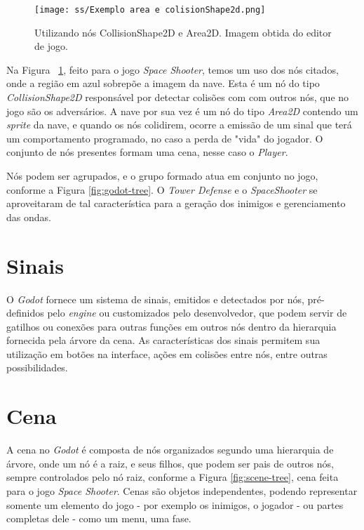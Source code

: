 \begin{figure}
  \centering
  \texttt{[image: ss/Exemplo area e colisionShape2d.png]}
  \caption{Utilizando nós CollisionShape2D e Area2D. Imagem obtida do editor de jogo.\label{fig:area-collision}}
\end{figure}

Na Figura ~\ref{fig:area-collision}, feito para o jogo \textit{Space Shooter}, temos um uso dos nós citados, onde a região em azul sobrepõe a imagem da nave. Esta é um nó do tipo \textit{CollisionShape2D} responsável por detectar colisões com com outros nós, que no jogo são os adversários. A nave por sua vez é um nó do tipo \textit{Area2D} contendo um \textit{sprite} da nave, e quando os nós colidirem, ocorre a emissão de um sinal que terá um comportamento programado, no caso a perda de "vida" do jogador. O conjunto de nós presentes formam uma cena, nesse caso o \textit{Player}.

Nós podem ser agrupados, e o grupo formado atua em conjunto no jogo, conforme a Figura \ref{fig:godot-tree}. O \textit{Tower Defense} e o \textit{SpaceShooter} se aproveitaram de tal característica para a geração dos inimigos e gerenciamento das ondas.

\section{Sinais}
\label{sec:godot-sinais}

O \textit{Godot} fornece um sistema de sinais, emitidos e detectados por nós, pré-definidos pelo \textit{engine} ou customizados pelo desenvolvedor, que podem servir de gatilhos ou conexões para outras funções em outros nós dentro da hierarquia fornecida pela árvore da cena. As características dos sinais permitem sua utilização em botões na interface, ações em colisões entre nós, entre outras possibilidades.


\section{Cena}
\label{sec:godot-cena}

A cena no \textit{Godot} é composta de nós organizados segundo uma hierarquia de árvore, onde um nó é a raiz, e seus filhos, que podem ser pais de outros nós, sempre controlados pelo nó raiz, conforme a Figura \ref{fig:scene-tree}, cena feita para o jogo \textit{Space Shooter}. Cenas são objetos independentes, podendo representar somente um elemento do jogo - por exemplo os inimigos, o jogador - ou partes completas dele - como um menu, uma fase.

